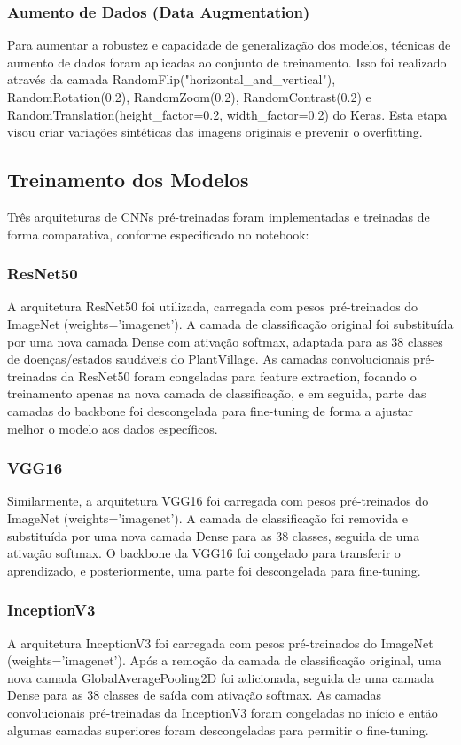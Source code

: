 \documentclass[10pt,conference]{IEEEtran}
\begin{document}
\subsubsection*{Aumento de Dados (Data Augmentation)}
Para aumentar a robustez e capacidade de generalização dos modelos, técnicas de aumento de dados foram aplicadas ao conjunto de treinamento. Isso foi realizado através da camada RandomFlip("horizontal\_and\_vertical"), RandomRotation(0.2), RandomZoom(0.2), RandomContrast(0.2) e RandomTranslation(height\_factor=0.2, width\_factor=0.2) do Keras. Esta etapa visou criar variações sintéticas das imagens originais e prevenir o overfitting. 
\subsection{Treinamento dos Modelos}
Três arquiteturas de CNNs pré-treinadas foram implementadas e treinadas de forma comparativa, conforme especificado no notebook: 
\subsubsection*{ResNet50}
A arquitetura ResNet50 foi utilizada, carregada com pesos pré-treinados do ImageNet (weights='imagenet'). A camada de classificação original foi substituída por uma nova camada Dense com ativação softmax, adaptada para as 38 classes de doenças/estados saudáveis do PlantVillage. As camadas convolucionais pré-treinadas da ResNet50 foram congeladas para feature extraction, focando o treinamento apenas na nova camada de classificação, e em seguida, parte das camadas do backbone foi descongelada para fine-tuning de forma a ajustar melhor o modelo aos dados específicos.
\subsubsection*{VGG16}
Similarmente, a arquitetura VGG16 foi carregada com pesos pré-treinados do ImageNet (weights='imagenet'). A camada de classificação foi removida e substituída por uma nova camada Dense para as 38 classes, seguida de uma ativação softmax. O backbone da VGG16 foi congelado para transferir o aprendizado, e posteriormente, uma parte foi descongelada para fine-tuning. 
\subsubsection*{InceptionV3}
    A arquitetura InceptionV3 foi carregada com pesos pré-treinados do ImageNet (weights='imagenet'). Após a remoção da camada de classificação original, uma nova camada GlobalAveragePooling2D foi adicionada, seguida de uma camada Dense para as 38 classes de saída com ativação softmax. As camadas convolucionais pré-treinadas da InceptionV3 foram congeladas no início e então algumas camadas superiores foram descongeladas para permitir o fine-tuning. 
\end{document}
